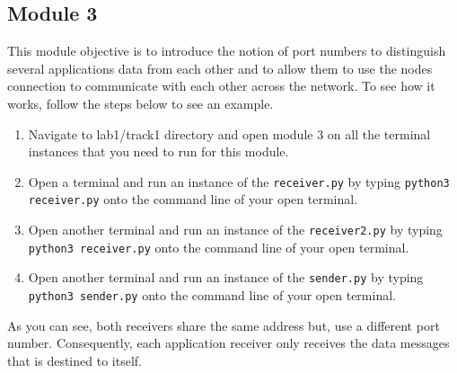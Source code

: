 \documentclass[11pt]{article}
\begin{document}



\subsection{Module 3}
\label{subsec:module3}
This module objective is to introduce the notion of port numbers to distinguish several applications data from each other and to allow them to use the nodes connection to communicate with each other across the network. To see how it works, follow the steps below to see an example.


\begin{enumerate}
    \item Navigate to lab1/track1 directory and open module 3 on all the terminal instances that you need to run for this module.
    \item Open a terminal and run an instance of the \texttt{receiver.py} by typing \texttt{python3 receiver.py} onto the command line of your open terminal.
    \item Open another terminal and run an instance of the \texttt{receiver2.py} by typing \texttt{python3 receiver.py} onto the command line of your open terminal.
    \item Open another terminal and run an instance of the \texttt{sender.py} by typing \texttt{python3 sender.py} onto the command line of your open terminal.
\end{enumerate}

As you can see, both receivers share the same address but, use a different port number. Consequently, each application receiver only receives the data messages that is destined to itself.
\end{document}
